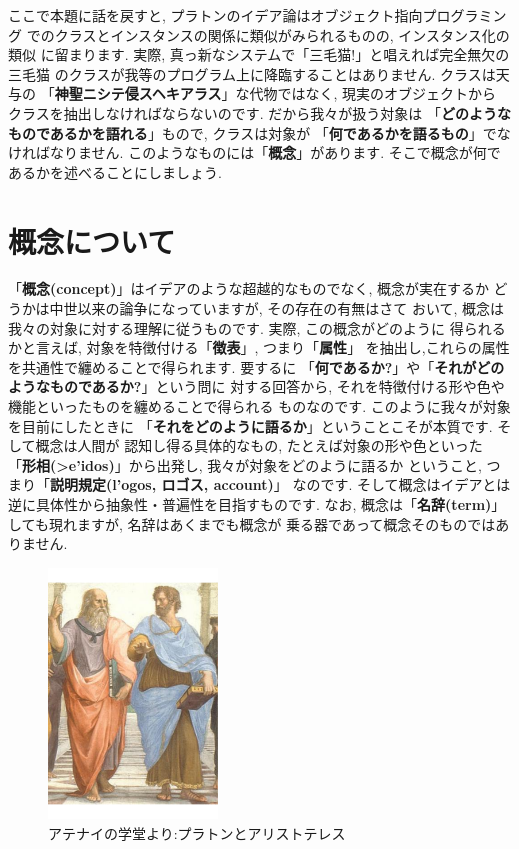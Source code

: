 ここで本題に話を戻すと, プラトンのイデア論はオブジェクト指向プログラミング
でのクラスとインスタンスの関係に類似がみられるものの, インスタンス化の類似
に留まります. 実際, 真っ新なシステムで「三毛猫!」と唱えれば完全無欠の三毛猫
のクラスが我等のプログラム上に降臨することはありません. クラスは天与の
「\textbf{神聖ニシテ侵スヘキアラス}」な代物ではなく, 現実のオブジェクトから
クラスを抽出しなければならないのです. だから我々が扱う対象は
「\textbf{どのようなものであるかを語れる}」もので, クラスは対象が
「\textbf{何であるかを語るもの}」でなければなりません. このようなものには「\textbf{概念}」があります. そこで概念が何であるかを述べることにしましょう.
\newpage

\section{概念について}


「\textbf{概念(concept)}」はイデアのような超越的なものでなく, 概念が実在するか
どうかは中世以来の論争\cite{普遍論争}になっていますが, その存在の有無はさて
おいて, 概念は我々の対象に対する理解に従うものです. 実際, この概念がどのように
得られるかと言えば, 対象を特徴付ける「\textbf{徴表}」, つまり「\textbf{属性}」
を抽出し,これらの属性を共通性で纏めることで得られます. 要するに
「\textbf{何であるか?}」や「\textbf{それがどのようなものであるか?}」という問に
対する回答から, それを特徴付ける形や色や機能といったものを纏めることで得られる
ものなのです. このように我々が対象を目前にしたときに
「\textbf{それをどのように語るか}」ということこそが本質です. そして概念は人間が
認知し得る具体的なもの, たとえば対象の形や色といった
「\textbf{形相(\textgreek{>e'idos})}」から出発し, 我々が対象をどのように語るか
ということ, つまり「\textbf{説明規定(\textgreek{l'ogos}, ロゴス, account)}」
なのです. そして概念はイデアとは逆に具体性から抽象性・普遍性を目指すものです.
 なお, 概念は「\textbf{名辞(term)}」しても現れますが, 名辞はあくまでも概念が
乗る器であって概念そのものではありません.
\newline

\begin{figure}
\includegraphics[width=4.5cm]{Plato_and_Aristotle_in_The_School_of_Athens,_by_italian_Rafael.pdf}
\caption{アテナイの学堂より:プラトンとアリストテレス}
\label{fig:Plato-Aristotle}
\end{figure}



